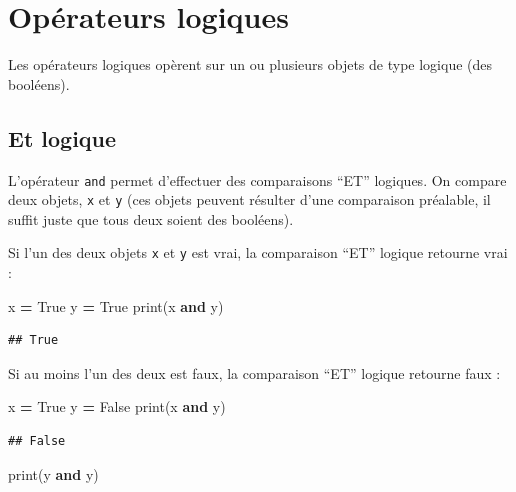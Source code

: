 \documentclass[12pt,]{book}
\newenvironment{Shaded}{\begin{snugshade}}{\end{snugshade}}
\newcommand{\KeywordTok}[1]{\textcolor[rgb]{0.13,0.29,0.53}{\textbf{#1}}}
\newcommand{\VariableTok}[1]{\textcolor[rgb]{0.00,0.00,0.00}{#1}}
\newcommand{\OperatorTok}[1]{\textcolor[rgb]{0.81,0.36,0.00}{\textbf{#1}}}
\newcommand{\BuiltInTok}[1]{#1}
\newcommand{\NormalTok}[1]{#1}
\numberwithin{equation}{section}
\numberwithin{countremarque}{section}
\begin{document}
\section{Opérateurs logiques}\label{operateurs-logiques}

Les opérateurs logiques opèrent sur un ou plusieurs objets de type
logique (des booléens).

\subsection{Et logique}\label{et-logique}

L'opérateur \texttt{and} permet d'effectuer des comparaisons ``ET''
logiques. On compare deux objets, \texttt{x} et \texttt{y} (ces objets
peuvent résulter d'une comparaison préalable, il suffit juste que tous
deux soient des booléens).

Si l'un des deux objets \texttt{x} et \texttt{y} est vrai, la
comparaison ``ET'' logique retourne vrai :

\begin{Shaded}
\begin{Highlighting}[]
\NormalTok{x }\OperatorTok{=} \VariableTok{True}
\NormalTok{y }\OperatorTok{=} \VariableTok{True}
\BuiltInTok{print}\NormalTok{(x }\KeywordTok{and}\NormalTok{ y)}
\end{Highlighting}
\end{Shaded}

\begin{lstlisting}
## True
\end{lstlisting}

Si au moins l'un des deux est faux, la comparaison ``ET'' logique
retourne faux :

\begin{Shaded}
\begin{Highlighting}[]
\NormalTok{x }\OperatorTok{=} \VariableTok{True}
\NormalTok{y }\OperatorTok{=} \VariableTok{False}
\BuiltInTok{print}\NormalTok{(x }\KeywordTok{and}\NormalTok{ y)}
\end{Highlighting}
\end{Shaded}

\begin{lstlisting}
## False
\end{lstlisting}

\begin{Shaded}
\begin{Highlighting}[]
\BuiltInTok{print}\NormalTok{(y }\KeywordTok{and}\NormalTok{ y)}
\end{Highlighting}
\end{Shaded}
\end{document}
